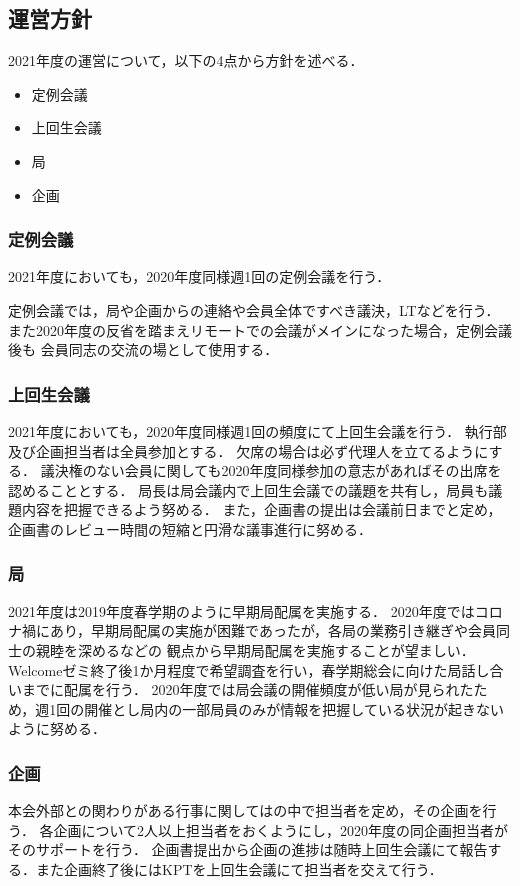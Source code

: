 \subsection*{運営方針}


2021年度の運営について，以下の4点から方針を述べる．
\begin{itemize}
    \item 定例会議
    \item 上回生会議
    \item 局
    \item 企画
\end{itemize}

\subsubsection*{定例会議}
2021年度においても，2020年度同様週1回の定例会議を行う．

定例会議では，局や企画からの連絡や会員全体ですべき議決，LTなどを行う．
また2020年度の反省を踏まえリモートでの会議がメインになった場合，定例会議後も
会員同志の交流の場として使用する．

\subsubsection*{上回生会議}
2021年度においても，2020年度同様週1回の頻度にて上回生会議を行う．
執行部及び企画担当者は全員参加とする．
欠席の場合は必ず代理人を立てるようにする．
議決権のない会員に関しても2020年度同様参加の意志があればその出席を認めることとする．
局長は局会議内で上回生会議での議題を共有し，局員も議題内容を把握できるよう努める．
また，企画書の提出は会議前日までと定め，企画書のレビュー時間の短縮と円滑な議事進行に努める．

\subsubsection*{局}
2021年度は2019年度春学期のように早期局配属を実施する．
2020年度ではコロナ禍にあり，早期局配属の実施が困難であったが，各局の業務引き継ぎや会員同士の親睦を深めるなどの
観点から早期局配属を実施することが望ましい．
Welcomeゼミ終了後1か月程度で希望調査を行い，春学期総会に向けた局話し合いまでに配属を行う．
2020年度では局会議の開催頻度が低い局が見られたため，週1回の開催とし局内の一部局員のみが情報を把握している状況が起きないように努める．

\subsubsection*{企画}
本会外部との関わりがある行事に関しては\secondGrade{}の中で担当者を定め，その企画を行う．
各企画について2人以上担当者をおくようにし，2020年度の同企画担当者がそのサポートを行う．
企画書提出から企画の進捗は随時上回生会議にて報告する．また企画終了後にはKPTを上回生会議にて担当者を交えて行う．
